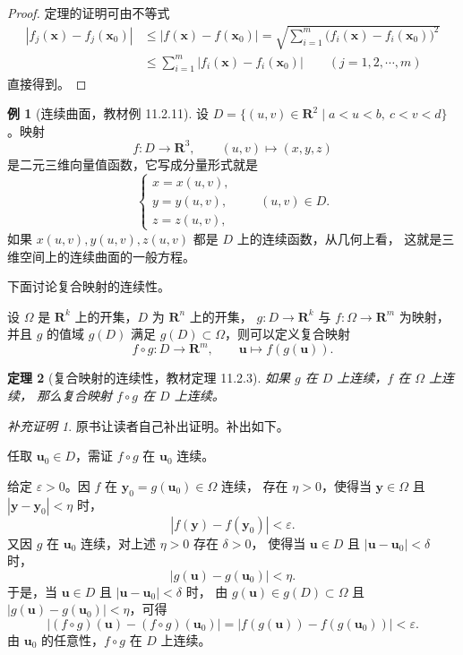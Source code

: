 \documentclass[11pt]{ctexart}
\theoremstyle{plain}
\newtheorem{thm}{定理}[section]
\theoremstyle{definition}
\newtheorem{ex}[thm]{例}
\theoremstyle{remark}
\newtheorem*{completion}{补充证明}
\begin{document}
\begin{proof}
定理的证明可由不等式
\begin{align*}
  |f_j(\boldsymbol{x})-f_j(\boldsymbol{x}_0)|
  &\le|f(\boldsymbol{x})-f(\boldsymbol{x}_0)|
  =\sqrt{\sum_{i=1}^{m}\bigl(f_i(\boldsymbol{x})-f_i(\boldsymbol{x}_0)\bigr)^2}\\
  &\le\sum_{i=1}^{m}|f_i(\boldsymbol{x})-f_i(\boldsymbol{x}_0)|
  \qquad (j=1,2,\cdots,m)
\end{align*}
直接得到。
\end{proof}

\begin{ex}[连续曲面，教材例 11.2.11]\label{ex:surface}
设 \(D=\{(u,v)\in\mathbf{R}^2\mid a<u<b,\ c<v<d\}\)。映射
\[
  f\colon D\to\mathbf{R}^3,\qquad (u,v)\mapsto(x,y,z)
\]
是二元三维向量值函数，它写成分量形式就是
\[
  \begin{cases}
    x=x(u,v),\\ y=y(u,v),\\ z=z(u,v),
  \end{cases}\qquad (u,v)\in D .
\]
如果 \(x(u,v),y(u,v),z(u,v)\) 都是 \(D\) 上的连续函数，从几何上看，
这就是三维空间上的连续曲面的一般方程。
\end{ex}

下面讨论复合映射的连续性。

设 \(\Omega\) 是 \(\mathbf{R}^k\) 上的开集，\(D\) 为 \(\mathbf{R}^n\) 上的开集，
\(g\colon D\to\mathbf{R}^k\) 与 \(f\colon\Omega\to\mathbf{R}^m\) 为映射，
并且 \(g\) 的值域 \(g(D)\) 满足 \(g(D)\subset\Omega\)，则可以定义复合映射
\[
  f\circ g\colon D\to\mathbf{R}^m,\qquad \boldsymbol{u}\mapsto f(g(\boldsymbol{u})).
\]

\begin{thm}[复合映射的连续性，教材定理 11.2.3]\label{thm:composite}
如果 \(g\) 在 \(D\) 上连续，\(f\) 在 \(\Omega\) 上连续，
那么复合映射 \(f\circ g\) 在 \(D\) 上连续。
\end{thm}

\begin{completion}
原书让读者自己补出证明。补出如下。

任取 \(\boldsymbol{u}_0\in D\)，需证 \(f\circ g\) 在 \(\boldsymbol{u}_0\) 连续。

给定 \(\varepsilon>0\)。因 \(f\) 在 \(\boldsymbol{y}_0=g(\boldsymbol{u}_0)\in\Omega\) 连续，
存在 \(\eta>0\)，使得当 \(\boldsymbol{y}\in\Omega\) 且
\(|\boldsymbol{y}-\boldsymbol{y}_0|<\eta\) 时，
\[
  |f(\boldsymbol{y})-f(\boldsymbol{y}_0)|<\varepsilon .
\]
又因 \(g\) 在 \(\boldsymbol{u}_0\) 连续，对上述 \(\eta>0\) 存在 \(\delta>0\)，
使得当 \(\boldsymbol{u}\in D\) 且 \(|\boldsymbol{u}-\boldsymbol{u}_0|<\delta\) 时，
\[
  |g(\boldsymbol{u})-g(\boldsymbol{u}_0)|<\eta .
\]
于是，当 \(\boldsymbol{u}\in D\) 且 \(|\boldsymbol{u}-\boldsymbol{u}_0|<\delta\) 时，
由 \(g(\boldsymbol{u})\in g(D)\subset\Omega\) 且
\(|g(\boldsymbol{u})-g(\boldsymbol{u}_0)|<\eta\)，可得
\[
  |(f\circ g)(\boldsymbol{u})-(f\circ g)(\boldsymbol{u}_0)|
  =|f(g(\boldsymbol{u}))-f(g(\boldsymbol{u}_0))|<\varepsilon .
\]
由 \(\boldsymbol{u}_0\) 的任意性，\(f\circ g\) 在 \(D\) 上连续。
\end{completion}
\end{document}
